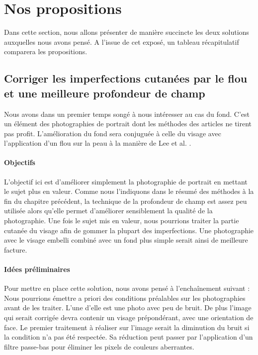 \documentclass[11pt, french]{report-rd-info}
\begin{document}
\section{Nos propositions}
Dans cette section, nous allons présenter de manière succincte les deux solutions auxquelles nous avons pensé. A l’issue de cet exposé, un tableau récapitulatif comparera les propositions.
\subsection{Corriger les imperfections cutanées par le flou et une meilleure profondeur de champ}
\label{propun}
Nous avons dans un premier temps songé à nous intéresser au cas du fond. C’est un élément des photographies de portrait dont les méthodes des articles ne tirent pas profit. L’amélioration du fond sera conjuguée à celle du visage avec l’application d’un flou sur la peau à la manière de Lee et al. \cite{Lee}.
\paragraph{Objectifs}
L’objectif ici est d’améliorer simplement la photographie de portrait en mettant le sujet plus en valeur. Comme nous l’indiquons dans le résumé des méthodes à la fin du chapitre précédent, la technique de la profondeur de champ est assez peu utilisée alors qu’elle permet d’améliorer sensiblement la qualité de la photographie. Une fois le sujet mis en valeur, nous pourrions traiter la partie cutanée du visage afin de gommer la plupart des imperfections. Une photographie avec le visage embelli combiné avec un fond plus simple serait ainsi de meilleure facture.
\paragraph{Idées préliminaires}
Pour mettre en place cette solution, nous avons pensé à l'enchaînement suivant :
Nous pourrions émettre a priori des conditions préalables sur les photographies avant de les traiter. L’une d’elle est une photo avec peu de bruit. De plus l’image qui serait corrigée devra contenir un visage prépondérant, avec une orientation de face.
Le premier traitement à réaliser sur l’image serait la diminution du bruit si la condition n’a pas été respectée. Sa réduction peut passer par l’application d’un filtre passe-bas pour éliminer les pixels de couleurs aberrantes.
\end{document}
